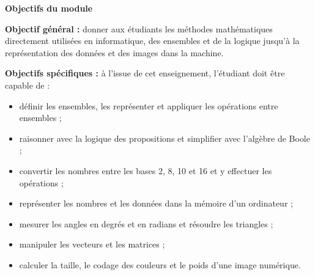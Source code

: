 
\renewcommand{\thesection}{\arabic{section}}

{\color{robleu}\Large\bfseries Objectifs du module}\par
\vspace{1.5mm}

\textbf{Objectif général :} donner aux étudiants les méthodes mathématiques directement utilisées en informatique, des ensembles et de la logique jusqu'à la représentation des données et des images dans la machine.

\vspace{2.2mm}
\textbf{Objectifs spécifiques :} à l'issue de cet enseignement, l'étudiant doit être capable de :
\begin{itemize}\small
  \item définir les ensembles, les représenter et appliquer les opérations entre ensembles ;
  \item raisonner avec la logique des propositions et simplifier avec l'algèbre de Boole ;
  \item convertir les nombres entre les bases 2, 8, 10 et 16 et y effectuer les opérations ;
  \item représenter les nombres et les données dans la mémoire d'un ordinateur ;
  \item mesurer les angles en degrés et en radians et résoudre les triangles ;
  \item manipuler les vecteurs et les matrices ;
  \item calculer la taille, le codage des couleurs et le poids d'une image numérique.
\end{itemize}

\vspace{4mm}
\begingroup
\makeatletter
\setcounter{tocdepth}{1}
\renewcommand*\l@chapter{\bfseries\@dottedtocline{0}{0em}{2.0em}}
{\par}\vspace{1.5mm}
{\small{}}
\makeatother
\endgroup

\clearpage
{}
